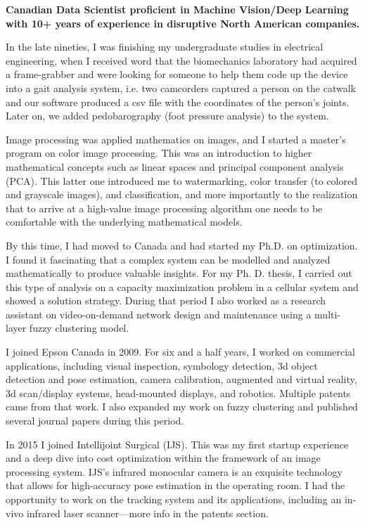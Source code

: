 \onehalfspace
\textbf{\large Canadian Data Scientist proficient in Machine Vision/Deep Learning with 10+ years of experience in 
disruptive North American companies.}
\singlespace

\vspace{1cm}

In the late nineties, I was finishing my undergraduate studies in electrical engineering, when I received word that
the biomechanics laboratory had acquired a frame-grabber and were looking for someone to help them code up the device
into a gait analysis system, i.e. two camcorders captured a person on the catwalk and our software produced 
a csv file with the coordinates of the person's joints. Later on, we added pedobarography (foot pressure analysis) to the 
system. 

Image processing was applied mathematics on images, and I started a master's program on color image processing. 
This was an introduction to higher mathematical concepts such as linear spaces and principal component analysis (PCA). This
latter one introduced me to watermarking, color transfer (to colored and grayscale images), and classification, and more 
importantly to the realization that to arrive at a high-value image processing algorithm one needs to be comfortable with
the underlying mathematical models. 

By this time, I had moved to Canada and had started my Ph.D. on optimization. I found it fascinating that a complex system can be modelled and analyzed mathematically to produce valuable insights. For my Ph. D. thesis, I carried out this type of analysis on a capacity maximization problem in a cellular system and showed a solution strategy. 
During that period I also worked as a research assistant on video-on-demand network design and maintenance using a multi-layer 
fuzzy clustering model.

I joined Epson Canada in 2009. For six and a half years, I worked on commercial applications, including visual inspection, 
symbology detection, 3d object detection and pose estimation, camera calibration, augmented and virtual reality, 3d scan/display systems, head-mounted displays, and robotics. Multiple patents came from that work. I also expanded my work on fuzzy clustering and published several journal papers during this period.

In 2015 I joined Intellijoint Surgical (IJS). This was my first startup experience and a deep dive into cost optimization within the framework of an image processing system. IJS's infrared monocular camera is an exquisite technology that allows for high-accuracy pose estimation in the operating room. I had the opportunity to work on the tracking system and its applications, including an in-vivo infrared laser scanner—more info in the patents section.

